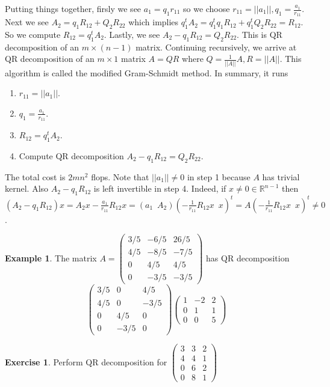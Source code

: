 \documentclass[12pt]{amsart}
\theoremstyle{definition}
\newtheorem{example}[theorem]{Example}
\newtheorem{exercise}[theorem]{Exercise}
\begin{document}
Putting things together, firsly we see $a_1 = q_1r_{11}$ so we choose $r_{11} = ||a_1||, q_1 = \frac{a_1}{r_{11}}$. Next we see $A_2 = q_1R_{12} + Q_2R_{22}$ which implies $q_1^tA_2 = q_1^tq_1R_{12} + q_1^tQ_2R_{22} = R_{12}$. So we compute $R_{12} = q_1^tA_2$. Lastly, we see $A_2 - q_1R_{12} = Q_2R_{22}$. This is QR decomposition of an $m \times (n-1)$ matrix. Continuing recursively, we arrive at QR decomposition of an $m \times 1$ matrix $A = QR$ where $Q = \frac{1}{||A||}A, R = ||A||$. This algorithm is called the modified Gram-Schmidt method. In summary, it runs
\begin{enumerate}[\indent 1.]
\item $r_{11} = ||a_1||$.
\item $q_1 = \frac{a_1}{r_{11}}$.
\item $R_{12} = q_1^t A_2$.
\item Compute QR decomposition $A_2 - q_1R_{12} = Q_2R_{22}$.
\end{enumerate} 

The total cost is $2mn^2$ flops. Note that $||a_1|| \neq 0$ in step 1 because $A$ has trivial kernel. Also $A_2 - q_1R_{12}$ is left invertible in step 4. Indeed, if $x \neq 0 \in \mathbb{R}^{n-1}$ then $(A_2 - q_1R_{12})x = A_2 x - \frac{a_1}{r_{11}}R_{12} x = (a_1 \,\,\, A_2)(- \frac{1}{r_{11}}R_{12}x \,\,\, x)^t = A(- \frac{1}{r_{11}}R_{12}x \,\,\, x)^t \neq 0$.

\begin{example}\label{QRdecompositionexample} The matrix $A = \left(\begin{array}{ccc} 3/5 & -6/5 & 26/5 \\ 4/5 & -8/5 & -7/5 \\ 0 & 4/5 & 4/5 \\ 0 & -3/5 & -3/5 \end{array} \right)$ has QR decomposition
$$\left(\begin{array}{ccc} 3/5 & 0 & 4/5 \\ 4/5 & 0 & -3/5 \\ 0 & 4/5 & 0 \\ 0 & -3/5 & 0 \end{array} \right) \left(\begin{array}{ccc} 1 & -2 & 2 \\ 0 & 1 & 1 \\ 0 & 0 & 5 \end{array} \right)$$
\end{example}

\begin{exercise}\label{} Perform QR decomposition for $\left(\begin{array}{ccc} 3 & 3 & 2 \\ 4 & 4 & 1\\ 0 & 6 & 2\\ 0 & 8 & 1 \end{array}\right)$
\end{exercise}
\end{document}
